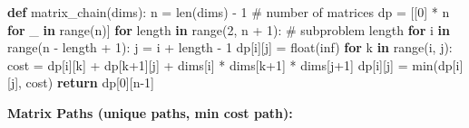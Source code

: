 \documentclass[11pt]{article}
\newenvironment{Shaded}{\begin{snugshade}}{\end{snugshade}}
\newcommand{\BuiltInTok}[1]{\textcolor[rgb]{0.50,0.55,0.55}{#1}}
\newcommand{\CommentTok}[1]{\textcolor[rgb]{0.48,0.49,0.49}{#1}}
\newcommand{\ControlFlowTok}[1]{\textcolor[rgb]{0.99,0.74,0.29}{\textbf{#1}}}
\newcommand{\DecValTok}[1]{\textcolor[rgb]{0.96,0.45,0.00}{#1}}
\newcommand{\KeywordTok}[1]{\textcolor[rgb]{0.81,0.81,0.76}{\textbf{#1}}}
\newcommand{\NormalTok}[1]{\textcolor[rgb]{0.81,0.81,0.76}{#1}}
\newcommand{\OperatorTok}[1]{\textcolor[rgb]{0.81,0.81,0.76}{#1}}
\newcommand{\StringTok}[1]{\textcolor[rgb]{0.96,0.31,0.31}{#1}}
\begin{document}
\begin{Shaded}
\begin{Highlighting}[]
\KeywordTok{def}\NormalTok{ matrix\_chain(dims):}
\NormalTok{    n }\OperatorTok{=} \BuiltInTok{len}\NormalTok{(dims) }\OperatorTok{{-}} \DecValTok{1}   \CommentTok{\# number of matrices}
\NormalTok{    dp }\OperatorTok{=}\NormalTok{ [[}\DecValTok{0}\NormalTok{] }\OperatorTok{*}\NormalTok{ n }\ControlFlowTok{for}\NormalTok{ \_ }\KeywordTok{in} \BuiltInTok{range}\NormalTok{(n)]}
    \ControlFlowTok{for}\NormalTok{ length }\KeywordTok{in} \BuiltInTok{range}\NormalTok{(}\DecValTok{2}\NormalTok{, n }\OperatorTok{+} \DecValTok{1}\NormalTok{):      }\CommentTok{\# subproblem length}
        \ControlFlowTok{for}\NormalTok{ i }\KeywordTok{in} \BuiltInTok{range}\NormalTok{(n }\OperatorTok{{-}}\NormalTok{ length }\OperatorTok{+} \DecValTok{1}\NormalTok{):}
\NormalTok{            j }\OperatorTok{=}\NormalTok{ i }\OperatorTok{+}\NormalTok{ length }\OperatorTok{{-}} \DecValTok{1}
\NormalTok{            dp[i][j] }\OperatorTok{=} \BuiltInTok{float}\NormalTok{(}\StringTok{\textquotesingle{}inf\textquotesingle{}}\NormalTok{)}
            \ControlFlowTok{for}\NormalTok{ k }\KeywordTok{in} \BuiltInTok{range}\NormalTok{(i, j):}
\NormalTok{                cost }\OperatorTok{=}\NormalTok{ dp[i][k] }\OperatorTok{+}\NormalTok{ dp[k}\OperatorTok{+}\DecValTok{1}\NormalTok{][j] }\OperatorTok{+}\NormalTok{ dims[i] }\OperatorTok{*}\NormalTok{ dims[k}\OperatorTok{+}\DecValTok{1}\NormalTok{] }\OperatorTok{*}\NormalTok{ dims[j}\OperatorTok{+}\DecValTok{1}\NormalTok{]}
\NormalTok{                dp[i][j] }\OperatorTok{=} \BuiltInTok{min}\NormalTok{(dp[i][j], cost)}
    \ControlFlowTok{return}\NormalTok{ dp[}\DecValTok{0}\NormalTok{][n}\OperatorTok{{-}}\DecValTok{1}\NormalTok{]}
\end{Highlighting}
\end{Shaded}

\textbf{Matrix Paths (unique paths, min cost path):}

\end{document}
